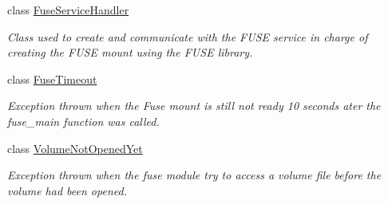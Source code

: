 \begin{DoxyCompactItemize}
class \hyperlink{class_gost_crypt_1_1_fuse_driver_1_1_fuse_service_handler}{Fuse\+Service\+Handler}
\begin{DoxyCompactList}\small\item\em Class used to create and communicate with the F\+U\+SE service in charge of creating the F\+U\+SE mount using the F\+U\+SE library. \end{DoxyCompactList}\item 
class \hyperlink{class_gost_crypt_1_1_fuse_driver_1_1_fuse_timeout}{Fuse\+Timeout}
\begin{DoxyCompactList}\small\item\em Exception thrown when the Fuse mount is still not ready 10 seconds ater the fuse\+\_\+main function was called. \end{DoxyCompactList}\item 
class \hyperlink{class_gost_crypt_1_1_fuse_driver_1_1_volume_not_opened_yet}{Volume\+Not\+Opened\+Yet}
\begin{DoxyCompactList}\small\item\em Exception thrown when the fuse module try to access a volume file before the volume had been opened. \end{DoxyCompactList}\end{DoxyCompactItemize}
